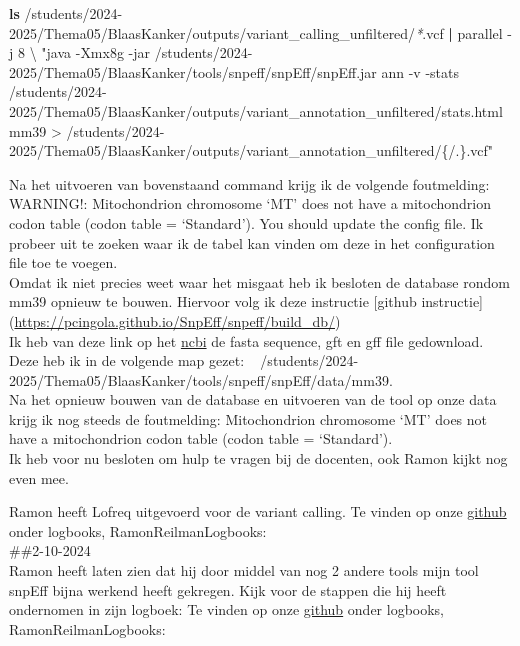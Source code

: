 \documentclass[
]{article}
\newenvironment{Shaded}{\begin{snugshade}}{\end{snugshade}}
\newcommand{\AttributeTok}[1]{\textcolor[rgb]{0.13,0.29,0.53}{#1}}
\newcommand{\DataTypeTok}[1]{\textcolor[rgb]{0.13,0.29,0.53}{#1}}
\newcommand{\ExtensionTok}[1]{#1}
\newcommand{\FunctionTok}[1]{\textcolor[rgb]{0.13,0.29,0.53}{\textbf{#1}}}
\newcommand{\KeywordTok}[1]{\textcolor[rgb]{0.13,0.29,0.53}{\textbf{#1}}}
\newcommand{\NormalTok}[1]{#1}
\newcommand{\PreprocessorTok}[1]{\textcolor[rgb]{0.56,0.35,0.01}{\textit{#1}}}
\newcommand{\StringTok}[1]{\textcolor[rgb]{0.31,0.60,0.02}{#1}}
\begin{document}
\begin{Shaded}
\begin{Highlighting}[]
\FunctionTok{ls}\NormalTok{ /students/2024{-}2025/Thema05/BlaasKanker/outputs/variant\_calling\_unfiltered/}\PreprocessorTok{*}\NormalTok{.vcf }\KeywordTok{|} \ExtensionTok{parallel} \AttributeTok{{-}j}\NormalTok{ 8 }\DataTypeTok{\textbackslash{}}
\StringTok{"java {-}Xmx8g {-}jar /students/2024{-}2025/Thema05/BlaasKanker/tools/snpeff/snpEff/snpEff.jar ann {-}v {-}stats /students/2024{-}2025/Thema05/BlaasKanker/outputs/variant\_annotation\_unfiltered/stats.html mm39 \textgreater{} /students/2024{-}2025/Thema05/BlaasKanker/outputs/variant\_annotation\_unfiltered/\{/.\}.vcf"}
\end{Highlighting}
\end{Shaded}

Na het uitvoeren van bovenstaand command krijg ik de volgende
foutmelding: WARNING!: Mitochondrion chromosome `MT' does not have a
mitochondrion codon table (codon table = `Standard'). You should update
the config file. Ik probeer uit te zoeken waar ik de tabel kan vinden om
deze in het configuration file toe te voegen.\\

Omdat ik niet precies weet waar het misgaat heb ik besloten de database
rondom mm39 opnieuw te bouwen. Hiervoor volg ik deze instructie
{[}github instructie{]}
(\url{https://pcingola.github.io/SnpEff/snpeff/build_db/})\\
Ik heb van deze link op het
\href{https://www.ncbi.nlm.nih.gov/datasets/genome/GCF_000001635.27/}{ncbi}
de fasta sequence, gft en gff file gedownload. Deze heb ik in de
volgende map gezet: ~
/students/2024-2025/Thema05/BlaasKanker/tools/snpeff/snpEff/data/mm39.\\

Na het opnieuw bouwen van de database en uitvoeren van de tool op onze
data krijg ik nog steeds de foutmelding: Mitochondrion chromosome `MT'
does not have a mitochondrion codon table (codon table = `Standard').\\

Ik heb voor nu besloten om hulp te vragen bij de docenten, ook Ramon
kijkt nog even mee.~

Ramon heeft Lofreq uitgevoerd voor de variant calling. Te vinden op onze
\href{https://github.com/RamonReilman/GenomicsTranscriptomics}{github}
onder logbooks, RamonReilmanLogbooks:\\

\#\#2-10-2024\\
Ramon heeft laten zien dat hij door middel van nog 2 andere tools mijn
tool snpEff bijna werkend heeft gekregen. Kijk voor de stappen die hij
heeft ondernomen in zijn logboek: Te vinden op onze
\href{https://github.com/RamonReilman/GenomicsTranscriptomics}{github}
onder logbooks, RamonReilmanLogbooks:\\
\end{document}
